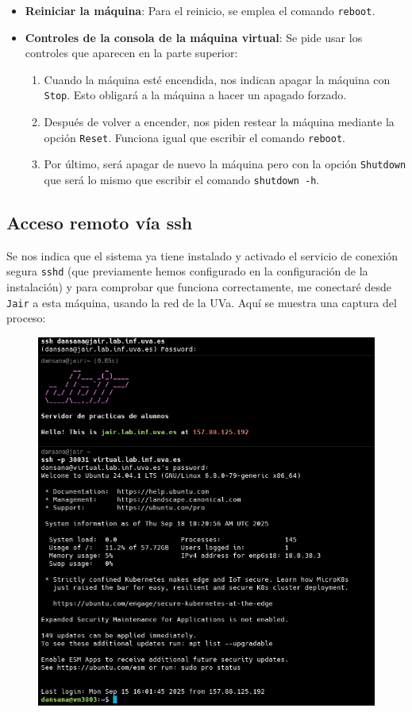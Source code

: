 \documentclass[10pt]{article}
\begin{document}
\begin{itemize}
		\item \textbf{Reiniciar la máquina}: Para el reinicio, se emplea el comando \verb|reboot|.
		\item \textbf{Controles de la consola de la máquina virtual}: Se pide usar los controles que aparecen en la parte superior:
		\begin{enumerate}
			\item Cuando la máquina esté encendida, nos indican apagar la máquina con \verb|Stop|. Esto obligará a la máquina a hacer un apagado forzado.
			\item Después de volver a encender, nos piden restear la máquina mediante la opción \verb|Reset|. Funciona igual que escribir el comando \verb|reboot|.
			\item Por último, será apagar de nuevo la máquina pero con la opción \verb|Shutdown| que será lo mismo que escribir el comando \verb|shutdown -h|.
		\end{enumerate}
	\end{itemize}
	
	\subsection{Acceso remoto vía ssh}
	Se nos indica que el sistema ya tiene instalado y activado el servicio de conexión segura \verb|sshd| (que previamente hemos configurado en la configuración de la instalación) y para comprobar que funciona correctamente, me conectaré desde \verb|Jair| a esta máquina, usando la red de la UVa. Aquí se muestra una captura del proceso:
	\begin{figure}[H]
		\setlength{\abovecaptionskip}{0cm}
		\setlength{\belowcaptionskip}{0cm}
		\centering
		\includegraphics[width=0.6\linewidth]{Recursos/ssh.png}
	\end{figure}
	
\end{document}
